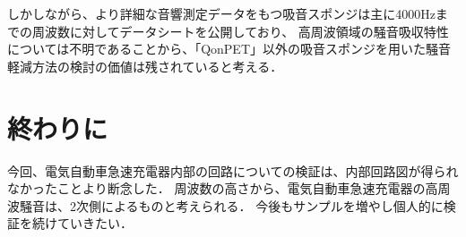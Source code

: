 \documentclass[dvipdfmx,titlepage,a4j]{jsarticle}  %
\begin{document}
しかしながら、より詳細な音響測定データをもつ吸音スポンジは主に4000Hzまでの周波数に対してデータシートを公開しており、
高周波領域の騒音吸収特性については不明であることから、「QonPET」以外の吸音スポンジを用いた騒音軽減方法の検討の価値は残されていると考える．

\section{終わりに}
今回、電気自動車急速充電器内部の回路についての検証は、内部回路図が得られなかったことより断念した．
周波数の高さから、電気自動車急速充電器の高周波騒音は、2次側によるものと考えられる．
今後もサンプルを増やし個人的に検証を続けていきたい．

\nocite{*}


\end{document}
